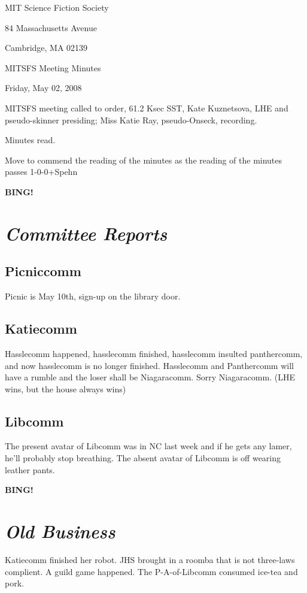 \documentclass[10pt]{article}
\newcommand{\bing}{{\bf BING!} }
\newcommand{\goto}[1]{\bing \vskip 12pt \section*{{\em{#1}}}}
\begin{document}
\begin{center}

MIT Science Fiction Society

84 Massachusetts Avenue

Cambridge, MA 02139

\vspace{12pt}

MITSFS Meeting Minutes

Friday, May 02, 2008

\end{center}

\vspace{18pt}

\setlength{\parskip}{6pt}

\noindent
MITSFS meeting called to order, 61.2 Ksec SST,
Kate Kuznetsova, LHE and pseudo-skinner presiding; Miss Katie Ray, pseudo-Onseck, recording.

Minutes read.

Move to commend the reading of the minutes as the reading of the minutes passes 1-0-0+Spehn

\BING

\goto{Committee Reports}

\subsection*{Picniccomm}

Picnic is May 10th, sign-up on the library door.

\subsection*{Katiecomm}

Hasslecomm happened, hasslecomm finished, hasslecomm insulted panthercomm, and now hasslecomm is no longer finished.  Hasslecomm and Panthercomm will have a rumble and the loser shall be Niagaracomm.  Sorry Niagaracomm.  (LHE wins, but the house always wins)

\subsection*{Libcomm}

The present avatar of Libcomm was in NC last week and if he gets any lamer, he'll probably stop breathing.  The absent avatar of Libcomm is off wearing leather pants.

\goto{Old Business}

Katiecomm finished her robot.  JHS brought in a roomba that is not three-laws complient.  A guild game happened.  The P-A-of-Libcomm consumed ice-tea and pork.
\end{document}
